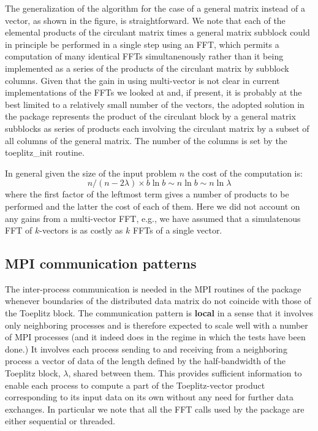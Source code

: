 The generalization of the algorithm for the case of a general matrix instead of a vector, as shown in the figure, is straightforward. We note that each of the elemental products of the circulant matrix times a general matrix subblock could in principle be performed in a single step using an F\-F\-T, which permits a computation of many identical F\-F\-Ts simultanenously rather than it being implemented as a series of the products of the circulant matrix by subblock columns. Given that the gain in using multi-\/vector is not clear in current implementations of the F\-F\-Ts we looked at and, if present, it is probably at the best limited to a relatively small number of the vectors, the adopted solution in the package represents the product of the circulant block by a general matrix subblocks as series of products each involving the circulant matrix by a subset of all columns of the general matrix. The number of the columns is set by the {\ttfamily toeplitz\-\_\-init} routine.

In general given the size of the input problem $n$ the cost of the computation is\-: \[ n/(n-2\lambda)\times b \ln b \sim n \ln b \sim n \ln \lambda \] where the first factor of the leftmost term gives a number of products to be performed and the latter the cost of each of them. Here we did not account on any gains from a multi-\/vector F\-F\-T, e.\-g., we have assumed that a simulatenous F\-F\-T of $k$-\/vectors is as costly as $k$ F\-F\-Ts of a single vector. \subsection{M\-P\-I communication patterns}\label{toeplitz_algo_communication}
The inter-\/process communication is needed in the M\-P\-I routines of the package whenever boundaries of the distributed data matrix do not coincide with those of the Toeplitz block. The communication pattern is {\bfseries local} in a sense that it involves only neighboring processes and is therefore expected to scale well with a number of M\-P\-I processes (and it indeed does in the regime in which the tests have been done.) It involves each process sending to and receiving from a neighboring process a vector of data of the length defined by the half-\/bandwidth of the Toeplitz block, $ \lambda$, shared between them. This provides sufficient information to enable each process to compute a part of the Toeplitz-\/vector product corresponding to its input data on its own without any need for further data exchanges. In particular we note that all the F\-F\-T calls used by the package are either sequential or threaded.

